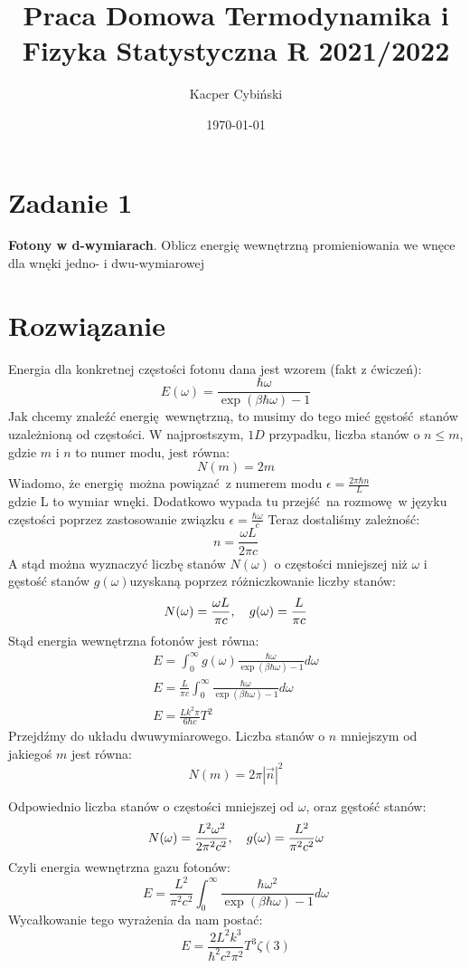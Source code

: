 \documentclass[12pt,a4paper]{article}
\title{Praca Domowa Termodynamika i Fizyka Statystyczna R 2021/2022}
\author{Kacper Cybiński}
\date{\today}
\renewcommand{\emph}{\textbf}
\begin{document}
\maketitle

\section{Zadanie 1}

\emph{Fotony w d-wymiarach}. Oblicz energię wewnętrzną promieniowania we wnęce dla wnęki jedno- i dwu-wymiarowej

\section{Rozwiązanie}

Energia dla konkretnej częstości fotonu dana jest wzorem (fakt z ćwiczeń):
$$
E(\omega)=\frac{\hbar \omega}{\exp (\beta \hbar \omega)-1}
$$
Jak chcemy znaleźć energię wewnętrzną, to musimy do tego mieć gęstość stanów uzależnioną od częstości. W najprostszym, $1D$ przypadku, liczba stanów o $n \leq m$, gdzie $m$ i $n$ to numer modu, jest równa: $$N(m)=2 m$$
Wiadomo, że energię można powiązać z numerem modu 
$
\epsilon=\frac{2 \pi \hbar n}{L}
$\\
gdzie L to wymiar wnęki. Dodatkowo wypada tu przejść na rozmowę w języku częstości poprzez zastosowanie związku 
$
\epsilon=\frac{\hbar \omega}{c}
$
Teraz dostaliśmy zależność:
$$
n=\frac{\omega L}{2 \pi c}
$$
A stąd można wyznaczyć liczbę stanów $N(\omega)$ o częstości mniejszej niż $\omega$ i gęstość stanów $g(\omega)$uzyskaną poprzez różniczkowanie liczby stanów:
$$
N(\omega)=\frac{\omega L}{\pi c} \qc g(\omega)=\frac{L}{\pi c}
$$
Stąd energia wewnętrzna fotonów jest równa:
$$
\begin{gathered}
E=\int_{0}^{\infty} g(\omega) \frac{\hbar \omega}{\exp (\beta \hbar \omega)-1} d \omega \\
E=\frac{L}{\pi c} \int_{0}^{\infty} \frac{\hbar \omega}{\exp (\beta \hbar \omega)-1} d \omega \\
E=\frac{L k^{2} \pi}{6 \hbar c} T^{2}
\end{gathered}
$$
Przejdźmy do układu dwuwymiarowego. Liczba stanów o $n$ mniejszym od jakiegoś $m$ jest równa:
$$
N(m)=2 \pi|\vec{n}|^{2}
$$

Odpowiednio liczba stanów o częstości mniejszej od $\omega$, oraz gęstość stanów:
$$
N(\omega)=\frac{L^{2} \omega^{2}}{2 \pi^{2} c^{2}} \qc g(\omega)=\frac{L^{2}}{\pi^{2} c^{2}} \omega
$$
Czyli energia wewnętrzna gazu fotonów:
$$
E=\frac{L^{2}}{\pi^{2} c^{2}} \int_{0}^{\infty} \frac{\hbar \omega^{2}}{\exp (\beta \hbar \omega)-1} d \omega
$$
Wycałkowanie tego wyrażenia da nam postać:
$$
E=\frac{2 L^{2} k^{3}}{\hbar^{2} c^{2} \pi^{2}} T^{3} \zeta(3)
$$
\end{document}
